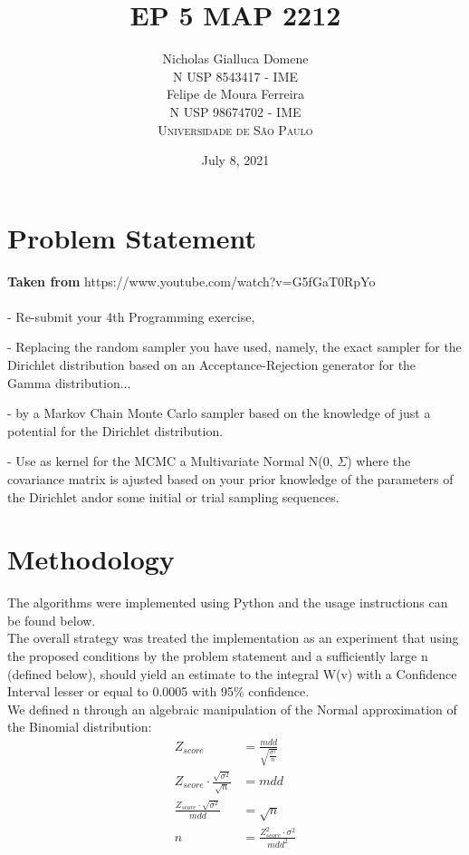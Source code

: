 \documentclass[12pt]{article}
\title{EP 5 MAP 2212} %
\author{Nicholas Gialluca Domene\\ %
N USP 8543417 - IME\\ %
Felipe de Moura Ferreira\\
N USP 98674702 - IME\\
\textsc{Universidade de São Paulo}
}
\date{July 8, 2021} %
\begin{document}
\setlength{\droptitle}{-5em}    
\maketitle

\section*{Problem Statement}
\textbf{Taken from} https://www.youtube.com/watch?v=G5fGaT0RpYo
\\ \\
- Re-submit your 4th Programming exercise,

- Replacing the random sampler you have used, namely, the exact sampler for the Dirichlet distribution based on an Acceptance-Rejection generator for the Gamma distribution...

- by a Markov Chain Monte Carlo sampler based on the knowledge of just a potential for the Dirichlet distribution.

- Use as kernel for the MCMC a Multivariate Normal N(0, $\Sigma$) where the covariance matrix is ajusted based on your prior knowledge of the parameters of the Dirichlet andor some initial or trial sampling sequences.

\section*{Methodology}

The algorithms were implemented using Python and the usage instructions can be found below. \\
The overall strategy was treated the implementation as an experiment that using the proposed conditions by the problem statement and a sufficiently large n (defined below), should yield an estimate to the integral W(v) with a Confidence Interval lesser or equal to 0.0005 with 95\% confidence.\\
We defined n through an algebraic manipulation of the Normal approximation of the Binomial distribution:
\begin{align}
Z_{score} & = \frac{mdd}{\sqrt{\frac{\sigma^{2}}{n}}}\nonumber\\
Z_{score}\cdot\frac{\sqrt{\sigma^{2}}}{\sqrt{n}} & = mdd\nonumber\\
\frac{Z_{score}\cdot\sqrt{\sigma^{2}}}{mdd} & = \sqrt{n}\nonumber\\
n &= \frac{Z_{score}^{2}\cdot\sigma^{2}}{mdd^{2}}
\end{align}
\end{document}
